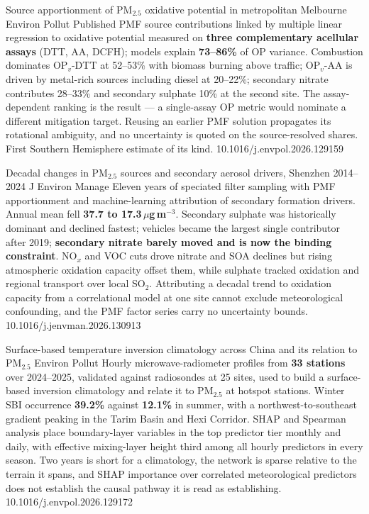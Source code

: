 \documentclass[10pt]{article}
\begin{document}

{Source apportionment of PM$_{2.5}$ oxidative potential in metropolitan Melbourne}
{Environ Pollut}
{Published PMF source contributions linked by multiple linear regression to oxidative
potential measured on \textbf{three complementary acellular assays} (DTT, AA, DCFH);
models explain \textbf{73--86\%} of OP variance. Combustion dominates OP$_v$-DTT at
52--53\% with biomass burning above traffic; OP$_v$-AA is driven by metal-rich sources
including diesel at 20--22\%; secondary nitrate contributes 28--33\% and secondary
sulphate 10\% at the second site. The assay-dependent ranking is the result --- a
single-assay OP metric would nominate a different mitigation target. Reusing an earlier
PMF solution propagates its rotational ambiguity, and no uncertainty is quoted on the
source-resolved shares. First Southern Hemisphere estimate of its kind.}
{10.1016/j.envpol.2026.129159}

{Decadal changes in PM$_{2.5}$ sources and secondary aerosol drivers, Shenzhen 2014--2024}
{J Environ Manage}
{Eleven years of speciated filter sampling with PMF apportionment and machine-learning
attribution of secondary formation drivers. Annual mean fell \textbf{37.7 to
17.3\,$\mu$g\,m$^{-3}$}. Secondary sulphate was historically dominant and declined
fastest; vehicles became the largest single contributor after 2019; \textbf{secondary
nitrate barely moved and is now the binding constraint}. NO$_x$ and VOC cuts drove nitrate
and SOA declines but rising atmospheric oxidation capacity offset them, while sulphate
tracked oxidation and regional transport over local SO$_2$. Attributing a decadal trend to
oxidation capacity from a correlational model at one site cannot exclude meteorological
confounding, and the PMF factor series carry no uncertainty bounds.}
{10.1016/j.jenvman.2026.130913}

{Surface-based temperature inversion climatology across China and its relation to PM$_{2.5}$}
{Environ Pollut}
{Hourly microwave-radiometer profiles from \textbf{33 stations} over 2024--2025, validated
against radiosondes at 25 sites, used to build a surface-based inversion climatology and
relate it to PM$_{2.5}$ at hotspot stations. Winter SBI occurrence \textbf{39.2\%} against
\textbf{12.1\%} in summer, with a northwest-to-southeast gradient peaking in the Tarim
Basin and Hexi Corridor. SHAP and Spearman analysis place boundary-layer variables in the
top predictor tier monthly and daily, with effective mixing-layer height third among all
hourly predictors in every season. Two years is short for a climatology, the network is
sparse relative to the terrain it spans, and SHAP importance over correlated
meteorological predictors does not establish the causal pathway it is read as
establishing.}
{10.1016/j.envpol.2026.129172}
\end{document}
